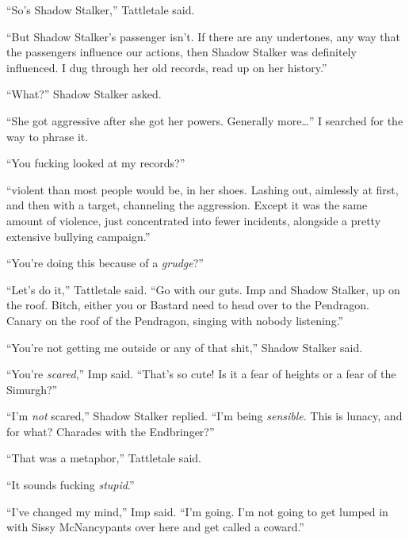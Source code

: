 ``So's Shadow Stalker,'' Tattletale said.



``But Shadow Stalker's passenger isn't.  If there are any undertones, any way that the passengers influence our actions, then Shadow Stalker was definitely influenced.  I dug through her old records, read up on her history.''



``What?'' Shadow Stalker asked.



``She got aggressive after she got her powers.  Generally more\ldots'' I searched for the way to phrase it.



``You fucking looked at my records?''



``\ldotsMore violent than most people would be, in her shoes.  Lashing out, aimlessly at first, and then with a target, channeling the aggression.  Except it was the same amount of violence, just concentrated into fewer incidents, alongside a pretty extensive bullying campaign.''



``You're doing this because of a \emph{grudge}?''



``Let's do it,'' Tattletale said.  ``Go with our guts.  Imp and Shadow Stalker, up on the roof.  Bitch, either you or Bastard need to head over to the Pendragon.  Canary on the roof of the Pendragon, singing with nobody listening.''



``You're not getting me outside or any of that shit,'' Shadow Stalker said.



``You're \emph{scared},'' Imp said.  ``That's so cute!  Is it a fear of heights or a fear of the Simurgh?''



``I'm \emph{not} scared,'' Shadow Stalker replied.  ``I'm being \emph{sensible}.  This is lunacy, and for what?  Charades with the Endbringer?''



``That was a metaphor,'' Tattletale said.



``It sounds fucking \emph{stupid}.''



``I've changed my mind,'' Imp said.  ``I'm going.  I'm not going to get lumped in with Sissy McNancypants over here and get called a coward.''



